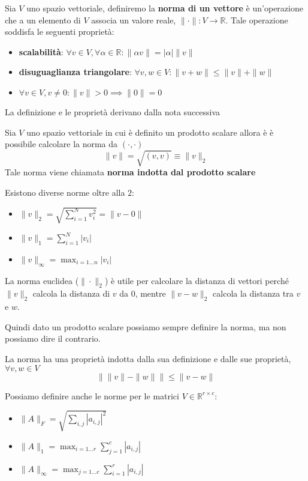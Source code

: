 \begin{definizione} 
    Sia $V$ uno spazio vettoriale, definiremo la \textbf{norma di un vettore} è
    un'operazione che a un elemento di $V$ associa un valore reale, $\|\cdot\|:
        V \rightarrow \mathbb{R}$. Tale operazione soddisfa le seguenti proprietà:
    \begin{itemize}
        \item \textbf{scalabilità}: $\forall v \in V,\forall \alpha \in \mathbb{R}:
                  \|\alpha v\| = |\alpha | \|v\|$
        \item \textbf{disuguaglianza triangolare}: $\forall v,w \in V: \|v+w\|
                  \le \|v\| + \|w\|$
        \item $\forall v \in V, v\ne 0: \|v\| > 0\implies \|0\| = 0$
    \end{itemize}
\end{definizione}
La definizione e le proprietà derivano dalla nota successiva
\begin{nota} 
    Sia $V$ uno spazio vettoriale in cui è definito un prodotto scalare allora è
    è possibile calcolare la norma da $(\cdot, \cdot)$
    \begin{equation}
        \|v\| = \sqrt{(v,v)}  \equiv \|v\|_2
    \end{equation}
    Tale norma viene chiamata \textbf{norma indotta dal prodotto scalare }
\end{nota}
\begin{nota}
    Esistono diverse norme oltre alla $2$:
    \begin{itemize}
        \item $\|v\|_2 = \sqrt{\sum_{i=1}^{N}v_i^2} = \|v-0\|$
        \item $\|v\|_1 = \sum_{i=1}^{N}|v_i|$
        \item $\|v\|_\infty = \max_{i= 1\dots n}|v_i|$
    \end{itemize}
\end{nota}
La norma euclidea ($\|\cdot\|_2$) è utile per calcolare la distanza di vettori
perché $\|v\|_2$ calcola la distanza di $v$ da $0$, mentre $\|v-w\|_2$ calcola
la distanza tra $v$ e $w$.

Quindi dato un prodotto scalare possiamo sempre definire la norma, ma non possiamo
dire il contrario.
\begin{nota}
    La norma ha una proprietà indotta dalla sua definizione e dalle sue proprietà,
    $\forall v,w \in V$
    \begin{equation*}
        \|\|v\| -\|w\|\| \le \|v-w\|
    \end{equation*}
\end{nota}
Possiamo definire anche le norme per le matrici $V\in \mathbb{R}^{r\times c}$:
\begin{itemize}
    \item $\|A\|_F = \sqrt{\sum_{i,j} |a_{i,j}|^2}$
    \item $\|A\|_1 = \max_{i=1\dots r}{\sum_{j=1}^{c} |a_{i,j}|}$
    \item $\|A\|_\infty = \max_{j=1\dots c}{\sum_{i=1}^{r} |a_{i,j}|}$
\end{itemize}


